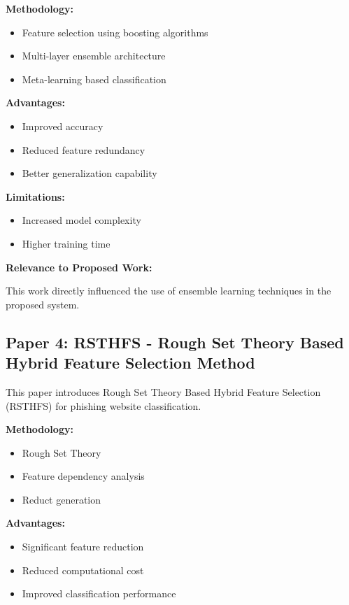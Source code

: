 \documentclass[12pt]{report}
\begin{document}
\textbf{Methodology:}
\begin{itemize}
    \item Feature selection using boosting algorithms
    \item Multi-layer ensemble architecture
    \item Meta-learning based classification
\end{itemize}

\textbf{Advantages:}
\begin{itemize}
    \item Improved accuracy
    \item Reduced feature redundancy
    \item Better generalization capability
\end{itemize}

\textbf{Limitations:}
\begin{itemize}
    \item Increased model complexity
    \item Higher training time
\end{itemize}

\textbf{Relevance to Proposed Work:}

This work directly influenced the use of ensemble learning techniques in the proposed system.

\subsection{Paper 4: RSTHFS - Rough Set Theory Based Hybrid Feature Selection Method}

This paper introduces Rough Set Theory Based Hybrid Feature Selection (RSTHFS) for phishing website classification.

\textbf{Methodology:}
\begin{itemize}
    \item Rough Set Theory
    \item Feature dependency analysis
    \item Reduct generation
\end{itemize}

\textbf{Advantages:}
\begin{itemize}
    \item Significant feature reduction
    \item Reduced computational cost
    \item Improved classification performance
\end{itemize}
\end{document}
